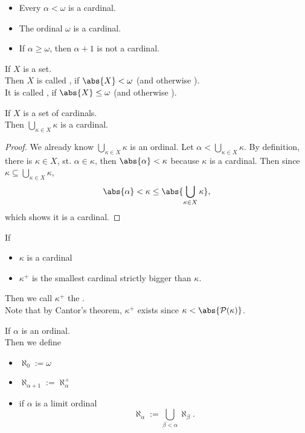 \begin{proposition}
    \begin{itemize}
        \item Every $\alpha < \omega$ is a cardinal.
        \item The ordinal $\omega$ is a cardinal.
        \item If $\alpha \geq \omega$, then $\alpha + 1$ is not a cardinal.
    \end{itemize}
\end{proposition}

\begin{definition}
    If $X$ is a set.\\
    Then $X$ is called , if $\abs{X} < \omega$ (and otherwise ).\\
    It is called , if $\abs{X} \leq \omega$ (and otherwise ).
\end{definition}


\begin{proposition}
    If $X$ is a set of cardinals.\\
    Then $\bigcup_{\kappa \in X} \kappa$ is a cardinal.
\end{proposition}
\begin{proof}
    We already know $\bigcup_{\kappa \in X} \kappa$ is an ordinal.
    Let $\alpha < \bigcup_{\kappa \in X} \kappa$. By definition, there is $\kappa \in X$, st.
    $ \alpha \in \kappa$, then $\abs{\alpha} < \kappa$ because $\kappa$ is a cardinal.
    Then since $\kappa \subseteq \bigcup_{\kappa \in X} \kappa$,
    $$ \abs{\alpha} < \kappa \leq \abs{\bigcup_{\kappa \in X} \kappa},$$
    which shows it is a cardinal.
\end{proof}

\begin{definition}
    If 
    \begin{itemize}
        \item $\kappa$ is a cardinal
        \item $\kappa^+$ is the smallest cardinal strictly bigger than $\kappa$.
    \end{itemize}
    Then we call $\kappa^+$ the .\\
    Note that by Cantor's theorem, $\kappa^+$ exists since $\kappa < \abs{\mathcal{P}(\kappa)}$.
\end{definition}

\begin{definition}
    If $\alpha$ is an ordinal.\\
    Then we define
    \begin{itemize}
        \item $\aleph_0:= \omega$
        \item $\aleph_{\alpha + 1} := \aleph_{\alpha}^+$
        \item if $\alpha$ is a limit ordinal
        $$ \aleph_\alpha := \bigcup_{\beta < \alpha} \aleph_\beta.$$
    \end{itemize}
\end{definition}

